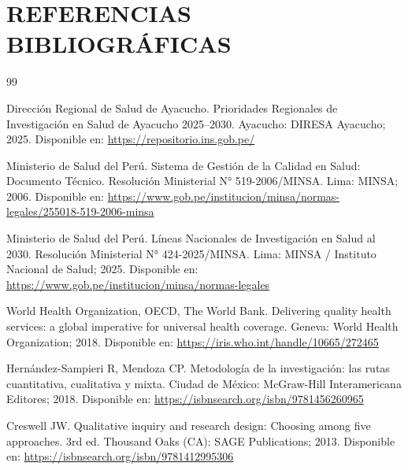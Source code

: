 \section*{REFERENCIAS BIBLIOGRÁFICAS}
\label{sec:referencias}

\begin{thebibliography}{99}
\itemsep 5pt

Dirección Regional de Salud de Ayacucho. Prioridades Regionales de Investigación en Salud de Ayacucho 2025--2030. Ayacucho: DIRESA Ayacucho; 2025. Disponible en: \url{https://repositorio.ins.gob.pe/}

Ministerio de Salud del Perú. Sistema de Gestión de la Calidad en Salud: Documento Técnico. Resolución Ministerial N° 519-2006/MINSA. Lima: MINSA; 2006. Disponible en: \url{https://www.gob.pe/institucion/minsa/normas-legales/255018-519-2006-minsa}

Ministerio de Salud del Perú. Líneas Nacionales de Investigación en Salud al 2030. Resolución Ministerial N° 424-2025/MINSA. Lima: MINSA / Instituto Nacional de Salud; 2025. Disponible en: \url{https://www.gob.pe/institucion/minsa/normas-legales}

World Health Organization, OECD, The World Bank. Delivering quality health services: a global imperative for universal health coverage. Geneva: World Health Organization; 2018. Disponible en: \url{https://iris.who.int/handle/10665/272465}

Hernández-Sampieri R, Mendoza CP. Metodología de la investigación: las rutas cuantitativa, cualitativa y mixta. Ciudad de México: McGraw-Hill Interamericana Editores; 2018. Disponible en: \url{https://isbnsearch.org/isbn/9781456260965}

Creswell JW. Qualitative inquiry and research design: Choosing among five approaches. 3rd ed. Thousand Oaks (CA): SAGE Publications; 2013. Disponible en: \url{https://isbnsearch.org/isbn/9781412995306}


\end{thebibliography}
